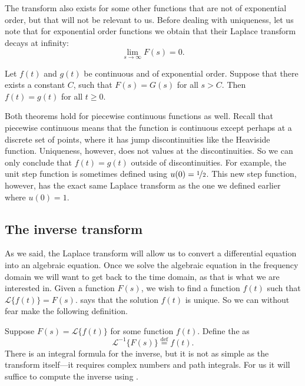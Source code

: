 The transform also exists for some other functions
that are not of exponential
order, but that will not be relevant to us.
Before dealing with uniqueness, let
us note that for exponential order functions we obtain that their
Laplace transform decays at infinity:
\begin{equation*}
\lim_{s\to\infty} F(s) = 0 .
\end{equation*}

\begin{theorem}[Uniqueness] \label{lt:uniqthm}
Let $f(t)$ and $g(t)$ be continuous and of exponential order.
Suppose that there exists a constant $C$,
such that $F(s) = G(s)$ for all $s > C$.
Then $f(t) = g(t)$ for all $t \geq 0$.
\end{theorem}

Both theorems hold for piecewise continuous functions as well.
Recall that piecewise continuous means that the function
is continuous except perhaps at a discrete set of points, where it has jump
discontinuities like the Heaviside function.  Uniqueness, however, does
not  values at the discontinuities.  So we can only conclude that
$f(t) = g(t)$ outside of discontinuities.  For example, the unit step
function is sometimes defined using $u(0) = \nicefrac{1}{2}$.  This new
step function, however, has the exact same Laplace transform
as the one we defined earlier where $u(0) = 1$.

\subsection{The inverse transform}

As we said, the Laplace transform will allow us to convert a differential
equation into an algebraic equation.  Once we solve the
algebraic equation in the frequency domain we will want to get back to the
time domain, as that is what we are interested in.
Given a function
$F(s)$, we wish to find a function
$f(t)$ such that $\mathcal{L} \bigl\{ f(t) \bigr\} = F(s)$.
 says that the solution $f(t)$ is unique.
So we can without fear make the following definition.

Suppose $F(s) = \mathcal{L} \bigl\{ f(t) \bigr\}$ for some function $f(t)$.
Define the
\emph{} as
\begin{equation*}
{\mathcal{L}}^{-1} \bigl\{ F(s) \bigr\} \overset{\text{def}}{=} f(t) .
\end{equation*}
There is an integral formula for the inverse, but it is not as simple
as the transform itself---it requires complex numbers and path integrals.
For us it will
suffice to
compute the inverse using .

